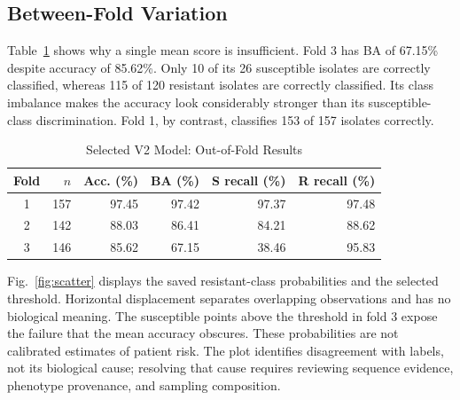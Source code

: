 \documentclass[conference]{IEEEtran}
\begin{document}
\subsection{Between-Fold Variation}
Table~\ref{tab:folds} shows why a single mean score is insufficient. Fold 3 has BA of 67.15\% despite accuracy of 85.62\%. Only 10 of its 26 susceptible isolates are correctly classified, whereas 115 of 120 resistant isolates are correctly classified. Its class imbalance makes the accuracy look considerably stronger than its susceptible-class discrimination. Fold 1, by contrast, classifies 153 of 157 isolates correctly.

\begin{table}[t]
\caption{Selected V2 Model: Out-of-Fold Results}
\label{tab:folds}
\centering\footnotesize
\begin{tabular}{crrrrr}\toprule
Fold & $n$ & Acc. (\%) & BA (\%) & S recall (\%) & R recall (\%)\\\midrule
1&157&97.45&97.42&97.37&97.48\\
2&142&88.03&86.41&84.21&88.62\\
3&146&85.62&67.15&38.46&95.83\\\bottomrule
\end{tabular}
\end{table}

Fig.~\ref{fig:scatter} displays the saved resistant-class probabilities and the selected threshold. Horizontal displacement separates overlapping observations and has no biological meaning. The susceptible points above the threshold in fold 3 expose the failure that the mean accuracy obscures. These probabilities are not calibrated estimates of patient risk. The plot identifies disagreement with labels, not its biological cause; resolving that cause requires reviewing sequence evidence, phenotype provenance, and sampling composition.
\end{document}
